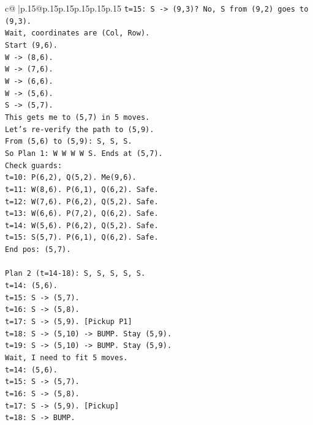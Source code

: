 \documentclass{article}
\begin{document}
{\begin{supertabular}{c@{$\;$}|p{.15\linewidth}@{}p{.15\linewidth}p{.15\linewidth}p{.15\linewidth}p{.15\linewidth}p{.15\linewidth}}
{{{\texttt{t=15: S {-}> (9,3)? No, S from (9,2) goes to (9,3).} \\
\texttt{Wait, coordinates are (Col, Row).} \\
\texttt{Start (9,6).} \\
\texttt{W {-}> (8,6).} \\
\texttt{W {-}> (7,6).} \\
\texttt{W {-}> (6,6).} \\
\texttt{W {-}> (5,6).} \\
\texttt{S {-}> (5,7).} \\
\texttt{This gets me to (5,7) in 5 moves.} \\
\texttt{Let's re{-}verify the path to (5,9).} \\
\texttt{From (5,6) to (5,9): S, S, S.} \\
\texttt{So Plan 1: W W W W S. Ends at (5,7).} \\
\texttt{Check guards:} \\
\texttt{t=10: P(6,2), Q(5,2). Me(9,6).} \\
\texttt{t=11: W(8,6). P(6,1), Q(6,2). Safe.} \\
\texttt{t=12: W(7,6). P(6,2), Q(5,2). Safe.} \\
\texttt{t=13: W(6,6). P(7,2), Q(6,2). Safe.} \\
\texttt{t=14: W(5,6). P(6,2), Q(5,2). Safe.} \\
\texttt{t=15: S(5,7). P(6,1), Q(6,2). Safe.} \\
\texttt{End pos: (5,7).} \\
\\ 
\texttt{Plan 2 (t=14{-}18): S, S, S, S, S.} \\
\texttt{t=14: (5,6).} \\
\texttt{t=15: S {-}> (5,7).} \\
\texttt{t=16: S {-}> (5,8).} \\
\texttt{t=17: S {-}> (5,9). {[}Pickup P1{]}} \\
\texttt{t=18: S {-}> (5,10) {-}> BUMP. Stay (5,9).} \\
\texttt{t=19: S {-}> (5,10) {-}> BUMP. Stay (5,9).} \\
\texttt{Wait, I need to fit 5 moves.} \\
\texttt{t=14: (5,6).} \\
\texttt{t=15: S {-}> (5,7).} \\
\texttt{t=16: S {-}> (5,8).} \\
\texttt{t=17: S {-}> (5,9). {[}Pickup{]}} \\
\texttt{t=18: S {-}> BUMP.} \\
}}}
\end{supertabular}}
\end{document}

